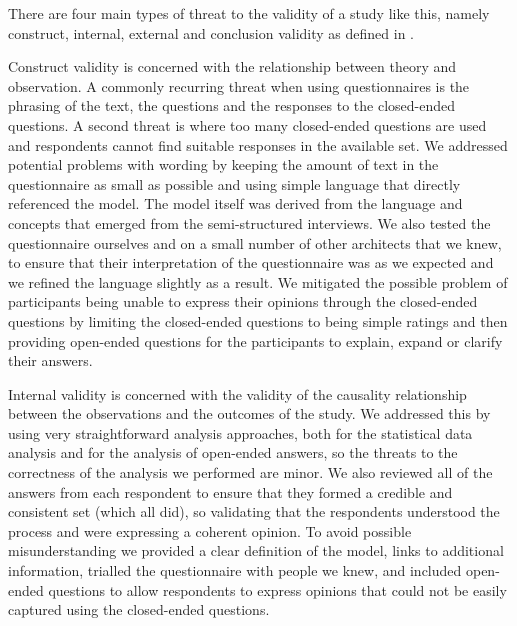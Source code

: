 There are four main types of threat to the validity of a study like this, namely construct, internal, 
external and conclusion validity as defined in \cite{matt1994-threatstovalidity}. 

Construct validity is concerned with the relationship between theory and observation.  A commonly recurring threat when using questionnaires is the phrasing of the text, the questions and the responses to the closed-ended questions.  A second threat is where too many closed-ended questions are used and respondents cannot find suitable responses in the available set.  We addressed potential problems with wording by keeping the amount of text in the questionnaire as small as possible and using simple language that directly referenced the model.  The model itself was derived from the language and concepts that emerged from the semi-structured interviews.  We also tested the questionnaire ourselves and on a small number of other architects that we knew, to ensure that their interpretation of the questionnaire was as we expected and we refined the language slightly as a result.  We mitigated the possible problem of participants being unable to express their opinions through the closed-ended questions by limiting the closed-ended questions to being simple ratings and then providing open-ended questions for the participants to explain, expand or clarify their answers.

Internal validity is concerned with the validity of the causality relationship between the observations and the outcomes of the study.  We addressed this by using very straightforward analysis approaches, both for the statistical data analysis and for the analysis of open-ended answers, so the threats to the correctness of the analysis we performed are minor.  We also reviewed all of the answers from each respondent to ensure that they formed a credible and consistent set (which all did), so validating that the respondents understood the process and were expressing a coherent opinion.  To avoid possible misunderstanding we provided a clear definition of the model, links to additional information, trialled the questionnaire with people we knew, and included open-ended questions to allow respondents to express opinions that could not be easily captured using the closed-ended questions.

